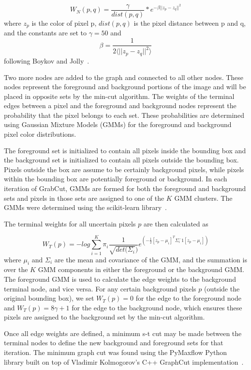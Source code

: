 \documentclass[10pt,twocolumn,letterpaper]{article}
\begin{document}
$$ W_N(p,q) = \frac{\gamma}{dist(p,q)} * e^{-\beta ||z_p-z_q||^2}$$ 
where $z_p$ is the color of pixel p, $dist(p,q)$ is the pixel distance between p and q, and the constants are set to $\gamma = 50$ and 
$$\beta = \frac{1}{2 \langle ||z_p-z_q||^2\rangle}$$
following Boykov and Jolly~\cite{Boykov:2001aa}.

Two more nodes are added to the graph and connected to all other nodes. These nodes represent the foreground and background portions of the image and will be placed in opposite sets by the min-cut algorithm. The weights of the terminal edges between a pixel and the foreground and background nodes represent the probability that the pixel belongs to each set. These probabilities are determined using Gaussian Mixture Models (GMMs) for the foreground and background pixel color distributions.

The foreground set is initialized to contain all pixels inside the bounding box and the background set is initialized to contain all pixels outside the bounding box. Pixels outside the box are assume to be certainly background pixels, while pixels within the bounding box are potentially foreground or background. In each iteration of GrabCut, GMMs are formed for both the foreground and background sets and pixels in those sets are assigned to one of the $K$ GMM clusters. The GMMs were determined using the scikit-learn library~\cite{scikit-learn}.

The terminal weights for all uncertain pixels $p$ are then calculated as

$$W_T(p) = - log \sum_{i=1}^K \pi_i \frac{1}{\sqrt{det(\Sigma_i})} e^{(-\frac{1}{2}[z_p-\mu_i]^T \Sigma_i^-1 [z_p - \mu_i])}$$
where $\mu_i$ and $\Sigma_i$ are the mean and covariance of the GMM, and the summation is over the $K$ GMM components in either the foreground or the background GMM. The foreground GMM is used to calculate the edge weights to the background terminal node, and vice versa. For any certain background pixels $p$ (outside the original bounding box), we set $W_T(p) = 0$ for the edge to the foreground node and $W_T(p) = 8\gamma + 1$ for the edge to the background node, which ensures these pixels are assigned to the background set by the min-cut algorithm.

Once all edge weights are defined, a minimum s-t cut may be made between the terminal nodes to define the new background and foreground sets for that iteration. The minimum graph cut was found using the PyMaxflow Python library built on top of Vladimir Kolmogorov's C++ GraphCut implementation~\cite{Boykov:2004aa}.
\end{document}

